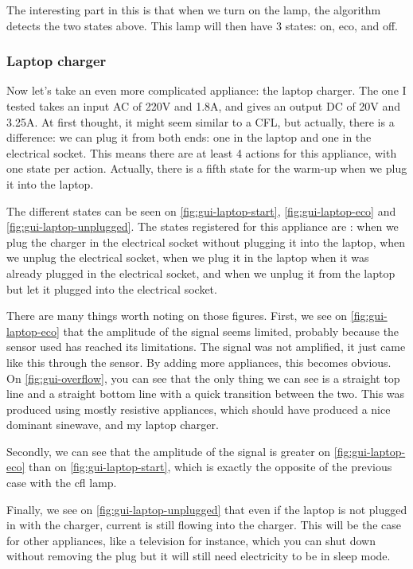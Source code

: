 The interesting part in this is that when we turn on the lamp, the algorithm detects the two states above. This lamp will then have 3 states: on, eco, and off.

\subsubsection{Laptop charger}
Now let's take an even more complicated appliance: the laptop charger. The one I tested takes an input AC of 220V and 1.8A, and gives an output DC of 20V and 3.25A.
At first thought, it might seem similar to a CFL, but actually, there is a difference: we can plug it from both ends: one in the laptop and one in the electrical socket. This means there are at least 4 actions for this appliance, with one state per action. Actually, there is a fifth state for the warm-up when we plug it into the laptop.

The different states can be seen on \autoref{fig:gui-laptop-start}, \autoref{fig:gui-laptop-eco} and \autoref{fig:gui-laptop-unplugged}. The states registered for this appliance are : when we plug the charger in the electrical socket without plugging it into the laptop, when we unplug the electrical socket, when we plug it in the laptop when it was already plugged in the electrical socket, and when we unplug it from the laptop but let it plugged into the electrical socket.

There are many things worth noting on those figures. First, we see on \autoref{fig:gui-laptop-eco} that the amplitude of the signal seems limited, probably because the sensor used has reached its limitations. The signal was not amplified, it just came like this through the sensor. By adding more appliances, this becomes obvious. On \autoref{fig:gui-overflow}, you can see that the only thing we can see is a straight top line and a straight bottom line with a quick transition between the two. This was produced using mostly resistive appliances, which should have produced a nice dominant sinewave, and my laptop charger.

Secondly, we can see that the amplitude of the signal is greater on \autoref{fig:gui-laptop-eco} than on \autoref{fig:gui-laptop-start}, which is exactly the opposite of the previous case with the \acrshort{cfl} lamp.

Finally, we see on \autoref{fig:gui-laptop-unplugged} that even if the laptop is not plugged in with the charger, current is still flowing into the charger. This will be the case for other appliances, like a television for instance, which you can shut down without removing the plug but it will still need electricity to be in sleep mode.

